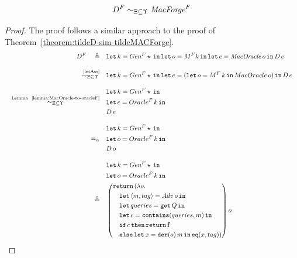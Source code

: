 \begin{theorem}\label{theorem:DF-sim-MacForgeF}
\[
D^F \sim_{\Xi\subseteq\Upsilon} \mathit{MacForge}^F
\]
\end{theorem}
\begin{proof}
The proof follows a similar approach to the proof of Theorem~\ref{theorem:tildeD-sim-tildeMACForge}.
\small{
\begin{align*}
    D^F \quad\triangleq\quad& \letin{k=Gen^F \star} \letin{o=M^F k}\letin{e=\mathit{MacOracle}\,o}{D\,e}
    \\[2ex]
    \quad\overset{\text{~\ref{letAss}}}{\simcontext}\quad&
    \begin{aligned}
        &\letin{k=Gen^F \star}{\letin{e=(\letin{o=M^F\,k}{MacOracle\,o)}}{D\,e}}
    \end{aligned}
    \\[2ex]
     \quad\overset{\text{Lemma ~\ref{lemma:MacOracle-to-oracleF}}}{\simcontext}\quad&
    \begin{aligned} 
        &\letin{k=Gen^F \star}{} \\
        &\letin{e=Oracle^F\,k}{} \\
        &{D\,e}
    \end{aligned}
    \\[2ex]
    \quad=_\alpha\quad&
    \begin{aligned}
        &\letin{k=Gen^F \star}{} \\
        &\letin{o=Oracle^F\,k}{} \\
        &{D\,o}
    \end{aligned}
    \\[2ex]
    \quad\triangleq\quad&
    \begin{aligned}
        &\letin{k=Gen^F \star}{} \\
        &\letin{o=Oracle^F\,k}{} \\
        &\left(
        \begin{aligned}
            &\return(\lambda o. \\
            &\quad\letin{\lis{m,tag} = Adv\, o}{} \\
            &\quad\letin{queries = \get Q}{} \\
            &\quad\letin{c=\mathtt{contains}(queries, m)}{} \\
            &\quad\mathtt{if}\, c\, \mathtt{then}\, \return \false \\
            &\quad\mathtt{else}\,\letin{x=\mathtt{der}(o)\, m}{\mathtt{eq}(x,tag)})
        \end{aligned}
        \right) o

\end{aligned}
\end{align*}}
\end{proof}
